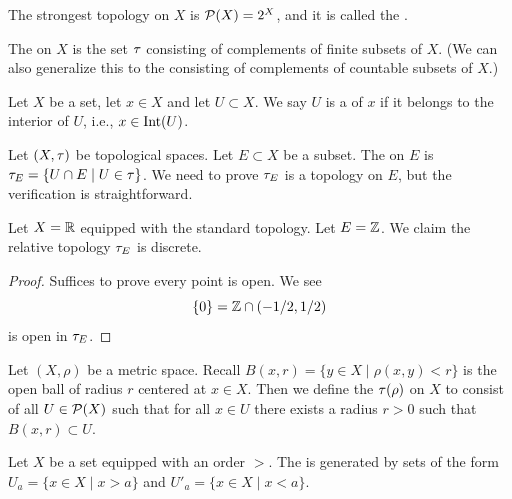 \begin{example}
The strongest topology on $X$ is $\mathcal{P}(X)=2^{X}$, and it is
called the .
\end{example}

\begin{example}
The  on $X$ is the set $\tau$ consisting of
complements of finite subsets of $X$. (We can also generalize this to
the  consisting of complements of
countable subsets of $X$.)
\end{example}

\begin{definition}
Let $X$ be a set, let $x\in X$ and let $U\subset X$.
We say $U$ is a  of $x$ if it belongs to the
interior of $U$, i.e., $x\in\operatorname{Int}(U)$.
\end{definition}

\begin{definition}
Let $(X,\tau)$ be topological spaces. Let $E\subset X$ be a subset.
The  on $E$ is $\tau_{E}=\{U\cap E\mid U\in\tau\}$.
We need to prove $\tau_{E}$ is a topology on $E$, but the verification
is straightforward.
\end{definition}

\begin{example}
Let $X=\mathbb{R}$ equipped with the standard topology. Let $E=\mathbb{Z}$. We claim
the relative topology $\tau_{E}$ is discrete.
\end{example}

\begin{proof}
  Suffices to prove every point is open. We see
  \begin{equation}
\{0\}=\mathbb{Z}\cap(-1/2,1/2)
  \end{equation}
  is open in $\tau_{E}$.
\end{proof}

\begin{definition}
Let $(X,\rho)$ be a metric space. Recall $B(x,r)=\{y\in X\mid\rho(x,y)<r\}$
is the open ball of radius $r$ centered at $x\in X$. Then we define
the  $\tau(\rho)$ on $X$ to consist of all
$U\in\mathcal{P}(X)$ such that for all $x\in U$ there exists a radius
$r>0$ such that $B(x,r)\subset U$.
\end{definition}

\begin{definition}
Let $X$ be a set equipped with an order $>$.
The  is generated by sets of the form
$U_{a}=\{x\in X\mid x>a\}$ and $U'_{a}=\{x\in X\mid x<a\}$.
\end{definition}

